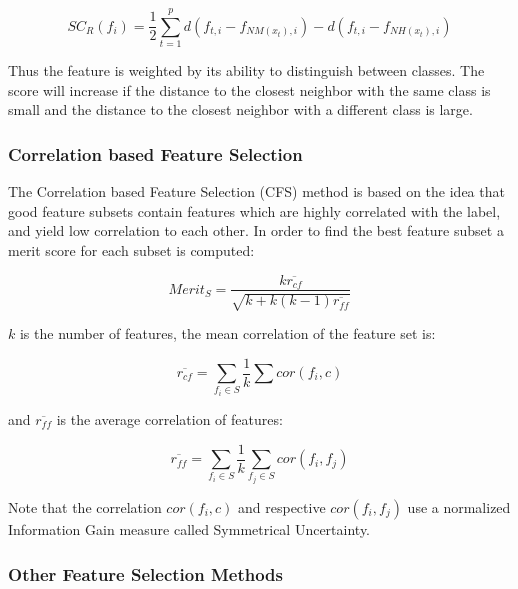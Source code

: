 				\begin{equation}
					\label{eq:relief}
						SC_R(f_i)=\frac{1}{2}\sum\limits_{t=1}^{p}d(f_{t,i}-f_{NM(x_t),i})-d(f_{t,i}-f_{NH(x_t),i})
				\end{equation}

				Thus the feature is weighted by its ability to distinguish between classes. The score will increase if the distance to the closest neighbor with the same class is small and the distance to the closest neighbor with a different class  is large.

			\subsubsection{Correlation based Feature Selection}
			\label{subsubsec:CFS}
			
				The Correlation based Feature Selection (CFS) method is based on the idea that good feature subsets contain features which are highly correlated with the label, and yield low correlation to each other. In order to find the best feature subset a merit score for each subset is computed:
				
				\begin{equation}
					Merit_S=\frac{k\overline{r_{cf}}}{\sqrt{k+k(k-1){\overline{r_{ff}}}}}
				\end{equation}

				$ k $ is the number of features, the mean correlation of the feature set is:
	
				\begin{equation}
					\overline{r_{cf}} = \sum \limits_{f_i\in S} \frac{1}{k}\sum cor(f_i,c) 
				\end{equation}

				and $\overline{r_{ff}}$ is the average correlation of features: 
				
				\begin{equation}
					\overline{r_{ff}} = \sum \limits_{f_i\in S} \frac{1}{k}\sum\limits_{f_j\in S} cor(f_i,f_j)
				\end{equation}

				Note that the correlation $ cor(f_i,c) $ and respective $ cor(f_i,f_j) $ use a normalized Information Gain measure called Symmetrical Uncertainty.

			\subsubsection{Other Feature Selection Methods}
			\label{subsubsec:other}


